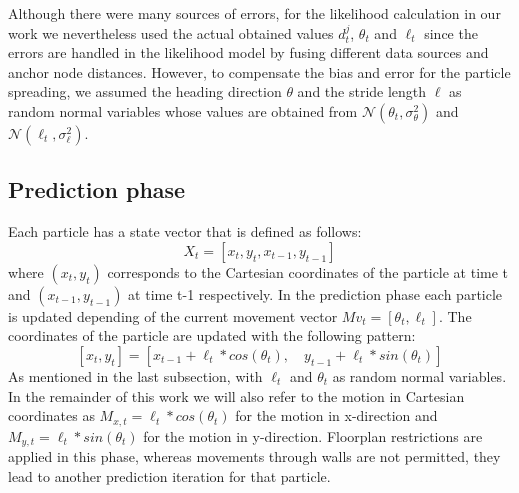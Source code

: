 Although there were many sources of errors, for the likelihood calculation in our work we nevertheless used the actual obtained values $d^{j}_{t}$, $\theta_{t}$ and $\ell_{t}$ since the errors are handled in the likelihood model by fusing different data sources and anchor node distances. However, to compensate the bias and error for the particle spreading, we assumed the heading direction $\theta$ and the stride length $\ell$ as random normal variables whose values are obtained from $\mathcal{N}(\theta_{t}, \sigma_{\theta}^{2})$ and $\mathcal{N}(\ell_{t}, \sigma_{\ell}^{2})$.

\subsection{Prediction phase}
Each particle has a state vector that is defined as follows:
$$X_{t} = [x_{t}, y_{t}, x_{t-1}, y_{t-1}]$$
where $(x_{t}, y_{t})$ corresponds to the Cartesian coordinates of the particle at time t and $(x_{t-1}, y_{t-1})$ at time t-1 respectively. In the prediction phase each particle is updated depending of the current movement vector $Mv_{t} = [\theta_{t}, \ell_{t}]$. The coordinates of the particle are updated with the following pattern:
$$[x_{t}, y_{t}]  = [x_{t-1} + \ell_{t} * cos(\theta_{t}),\quad y_{t-1} + \ell_{t} * sin(\theta_{t})]$$
As mentioned in the last subsection, with $\ell_{t}$ and $\theta_{t}$ as random normal variables. In the remainder of this work we will also refer to the motion in Cartesian coordinates as $M_{x,t} = \ell_{t} * cos(\theta_{t})$ for the motion in x-direction and $M_{y,t} = \ell_{t} * sin(\theta_{t})$ for the motion in y-direction.
Floorplan restrictions are applied in this phase, whereas movements through walls are not permitted, they lead to another prediction iteration for that particle.

